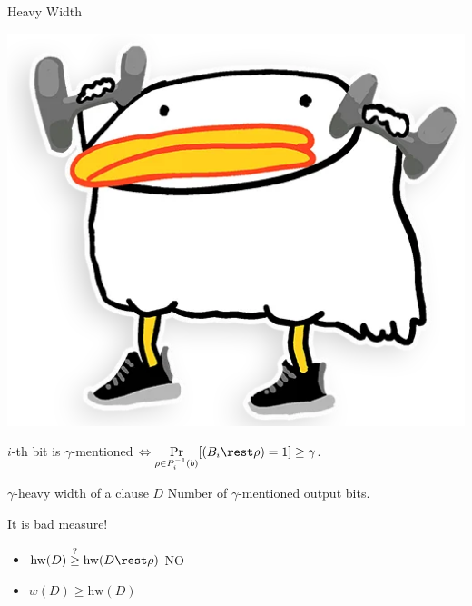 \begin{frame}{Heavy Width}

    \begin{center}
        \includegraphics[scale = 0.12]{pics/utia-lift.png}        
    \end{center}

    \vspace{0.3cm}

    $i$-th bit is $\gamma$-mentioned $\Leftrightarrow \Pr\limits_{\rho \in P_i^{-1}(b)}[(B_i \rest \rho) = 1] \ge \gamma$.

    \begin{block}{$\gamma$-heavy width of a clause $D$}
        Number of $\gamma$-mentioned output bits.
    \end{block}

    \pause
    \vspace{-1.5cm}
    \begin{minipage}[t][4cm][t]{0.5\linewidth}
        It is bad measure!        
        \pause
        \vspace{0.2cm}

        \begin{itemize}
            \item $\mathrm{hw}(D) \stackrel{?}{\ge} \mathrm{hw}(D \rest \rho)$ \pause
                \hspace{0.4cm} \alert{NO}
            \item $w(D) \ge \mathrm{hw}(D)$
        \end{itemize}
    \end{minipage}
    \pause
    \begin{minipage}[c][4cm][c]{0.45\linewidth}
        \vspace{2cm}
        \centering
                
    \end{minipage}

\end{frame}


